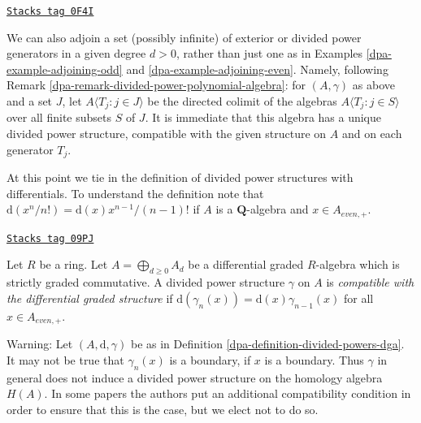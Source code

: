 \begin{remark}
\label{dpa-remark-adjoining-set-of-variables}
\href{https://stacks.math.columbia.edu/tag/0F4I}{\texttt{Stacks tag 0F4I}}

We can also adjoin a set (possibly infinite) of exterior or divided
power generators in a given degree $d > 0$, rather than just one
as in Examples \ref{dpa-example-adjoining-odd}
and \ref{dpa-example-adjoining-even}. Namely,
following Remark \ref{dpa-remark-divided-power-polynomial-algebra}:
for $(A,\gamma)$
as above and a set $J$, let $A\langle
T_j:j\in J\rangle$ be the directed colimit of the algebras
$A\langle T_j:j\in S\rangle$ over all finite subsets $S$
of $J$. It is immediate that this algebra has a unique divided power
structure, compatible with the given structure on $A$ and on
each generator $T_j$.
\end{remark}

At this point we tie in the definition of divided power structures
with differentials. To understand the definition note that
$\text{d}(x^n/n!) = \text{d}(x) x^{n - 1}/(n - 1)!$ if $A$
is a $\mathbf{Q}$-algebra and $x \in A_{even, +}$.

\begin{definition}
\label{dpa-definition-divided-powers-dga}
\href{https://stacks.math.columbia.edu/tag/09PJ}{\texttt{Stacks tag 09PJ}}

Let $R$ be a ring. Let $A = \bigoplus_{d \geq 0} A_d$ be a
differential graded $R$-algebra which is strictly graded commutative.
A divided power structure $\gamma$ on $A$ is {\it compatible with
the differential graded structure} if
$\text{d}(\gamma_n(x)) = \text{d}(x) \gamma_{n - 1}(x)$ for
all $x \in A_{even, +}$.
\end{definition}

Warning: Let $(A, \text{d}, \gamma)$ be as in
Definition \ref{dpa-definition-divided-powers-dga}.
It may not be true that $\gamma_n(x)$ is a boundary, if
$x$ is a boundary. Thus $\gamma$ in general does not induce
a divided power structure on the homology algebra $H(A)$.
In some papers the authors put an additional compatibility
condition in order to ensure that this is the case, but we elect
not to do so.


